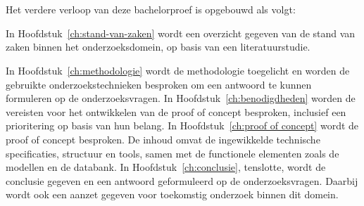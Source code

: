 \section{}%
\label{sec:opzet-bachelorproef}


Het verdere verloop van deze bachelorproef is opgebouwd als volgt:

In Hoofdstuk~\ref{ch:stand-van-zaken} wordt een overzicht gegeven van de stand van zaken binnen het onderzoeksdomein, op basis van een literatuurstudie.

In Hoofdstuk~\ref{ch:methodologie} wordt de methodologie toegelicht en worden de gebruikte onderzoekstechnieken besproken om een antwoord te kunnen formuleren op de onderzoeksvragen.
In Hoofdstuk~\ref{ch:benodigdheden}  worden de vereisten voor het ontwikkelen van de proof of concept besproken, inclusief een prioritering op basis van hun belang.
In Hoofdstuk~\ref{ch:proof of concept} wordt de proof of concept besproken. De inhoud omvat de ingewikkelde technische specificaties, structuur en tools, samen met de functionele elementen zoals de modellen en de databank.
In Hoofdstuk~\ref{ch:conclusie}, tenslotte, wordt de conclusie gegeven en een antwoord geformuleerd op de onderzoeksvragen. Daarbij wordt ook een aanzet gegeven voor toekomstig onderzoek binnen dit domein.